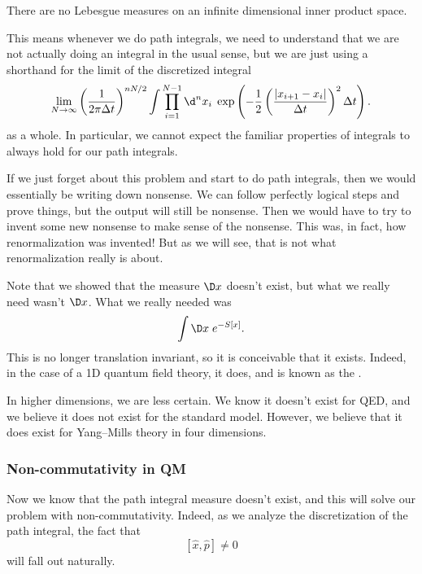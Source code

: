\documentclass[a4paper]{article}
\begin{document}
\begin{thm}
  There are no Lebesgue measures on an infinite dimensional inner product space.
\end{thm}

This means whenever we do path integrals, we need to understand that we are not actually doing an integral in the usual sense, but we are just using a shorthand for the limit of the discretized integral
\[
  \lim_{N \to \infty} \left(\frac{1}{2\pi \Delta t}\right)^{nN/2} \int \prod_{i = 1}^{N - 1} \d^n x_i\; \exp\left(- \frac{1}{2}\left(\frac{|x_{i + 1}- x_i|}{\Delta t}\right)^2 \Delta t\right).
\]
as a whole. In particular, we cannot expect the familiar properties of integrals to always hold for our path integrals.

If we just forget about this problem and start to do path integrals, then we would essentially be writing down nonsense. We can follow perfectly logical steps and prove things, but the output will still be nonsense. Then we would have to try to invent some new nonsense to make sense of the nonsense. This was, in fact, how renormalization was invented! But as we will see, that is not what renormalization really is about.

Note that we showed that the measure $\D x$ doesn't exist, but what we really need wasn't $\D x$. What we really needed was
\[
  \int \D x\; e^{-S[x]}.
\]
This is no longer translation invariant, so it is conceivable that it exists. Indeed, in the case of a 1D quantum field theory, it does, and is known as the .

In higher dimensions, we are less certain. We know it doesn't exist for QED, and we believe it does not exist for the standard model. However, we believe that it does exist for Yang--Mills theory in four dimensions.

\subsubsection*{Non-commutativity in QM}
Now we know that the path integral measure doesn't exist, and this will solve our problem with non-commutativity. Indeed, as we analyze the discretization of the path integral, the fact that
\[
  [\hat{x}, \hat{p}] \not= 0
\]
will fall out naturally.
\end{document}
